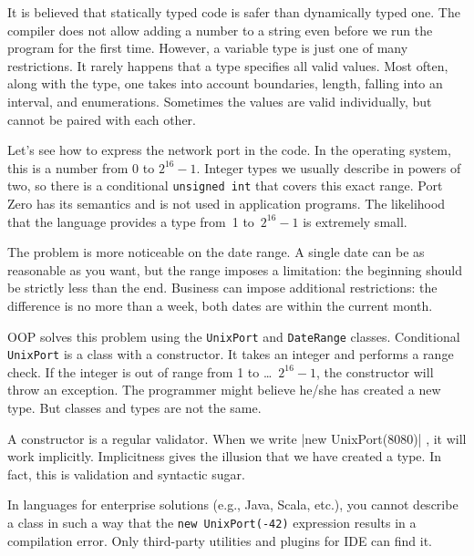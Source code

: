 \label{type-and-pred}


It is believed that statically typed code is safer than dynamically typed one. The compiler does not allow adding a number to a string even before we run the program for the first time. However, a variable type is just one of many restrictions. It rarely happens that a type specifies all valid values. Most often, along with the type, one takes into account boundaries, length, falling into an interval, and enumerations. Sometimes the values are valid individually, but cannot be paired with each other.


Let's see how to express the network port in the code. In the operating system, this is a number from 0 to $2^{16}-1$. Integer types we usually describe in powers of two, so there is a conditional \verb|unsigned int| that covers this exact range. Port Zero has its semantics and is not used in application programs. The likelihood that the language provides a type from~1 to~$2^{16}-1$ is extremely small.

The problem is more noticeable on the date range. A single date can be as reasonable as you want, but the range imposes a limitation: the beginning should be strictly less than the end. Business can impose additional restrictions: the difference is no more than a week, both dates are within the current month.


OOP solves this problem using the \verb|UnixPort| and \verb|DateRange| classes. Conditional \verb|UnixPort| is a class with a constructor. It takes an integer and performs a range check. If the integer is out of range from 1 to \dots~$2^{16}-1$, the constructor will throw an exception. The programmer might believe he/she has created a new type. But classes and types are not the same.

A constructor is a regular validator. When we write \spverb|new UnixPort(8080)| , it will work implicitly. Implicitness gives the illusion that we have created a type. In fact, this is validation and syntactic sugar.


In languages for enterprise solutions (e.g., Java, Scala, etc.), you cannot describe a class in such a way that the \verb|new UnixPort(-42)| expression results in a compilation error. Only third-party utilities and plugins for IDE can find it.

